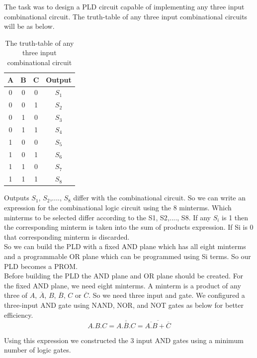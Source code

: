\documentclass[a4paper,11pt]{article}%
\begin{document}
The task was to design a PLD circuit capable of implementing any three input combinational circuit. The truth-table of any three input combinational circuits will be as below.\\

\begin{table}[H]
\centering
	\begin{tabular}{|c |c| c| c|}
		\hline
		A&B&C& Output\\\hline
	0 & 0 & 0 & $S_1 $ \\
	0 & 0 & 1 & $S_2$ \\
	0 & 1 & 0 & $S_3$ \\
	0 & 1 & 1 & $S_4$ \\
	1 & 0 & 0 & $S_5$ \\
	1 & 0 & 1 & $S_6$ \\
	1 & 1 & 0 & $S_7$ \\
	1 & 1 & 1 & $S_8$ \\\hline\hline
	\end{tabular}
\caption{The truth-table of any three input combinational circuit}
\end{table}

Outputs $S_1$, $S_2$,...., $S_8$ differ with the combinational circuit. So we can write an expression for the combinational logic circuit using the 8 minterms. Which minterms to be selected differ according to the S1, S2,...., S8. If any $S_i$ is 1 then the corresponding minterm is taken into the sum of products expression. If Si is 0 that corresponding minterm is discarded.\\

So we can build the PLD with a fixed AND plane which has all eight minterms and a programmable OR plane which can be programmed using Si terms. So our PLD becomes a PROM.\\

Before building the PLD the AND plane and OR plane should be created. For the fixed AND plane, we need eight minterms. A minterm is a product of any three of $A$, $\overline{A}$, $B$, $\overline{B}$, $C$ or $\overline{C}$. So we need three input and gate. We configured a three-input AND gate using NAND, NOR, and NOT gates as below for better efficiency.\\

\[ A.B.C = \overline{\overline{A.B.C}} = \overline{\overline{A.B} + \overline{C}} \]

Using this expression we constructed the 3 input AND gates using a minimum number of logic gates.
\end{document}

